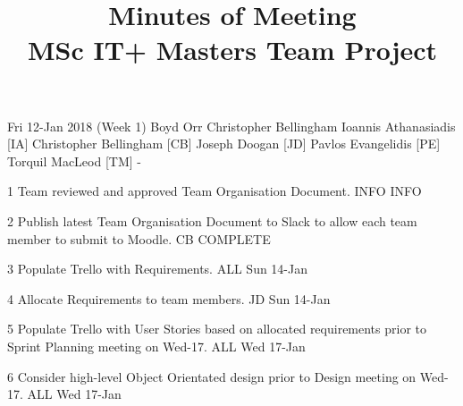 \documentclass[a4paper, 12pt]{article}
\title{Minutes of Meeting \\ MSc IT+ Masters Team Project}
\begin{document}
	\maketitle
	\momtoptable
	{Fri 12-Jan 2018 (Week 1)}
	{Boyd Orr}
	{Christopher Bellingham}
	{Ioannis Athanasiadis [IA]\newline
	Christopher Bellingham [CB]\newline
	Joseph Doogan [JD]\newline
	Pavlos Evangelidis [PE]\newline
	Torquil MacLeod [TM]}
	{-}

	\begin{momitems}
		\momitem
		{1}
		{Team reviewed and approved Team Organisation Document.}
		{INFO}
		{INFO}

		\momitem
		{2}
		{Publish latest Team Organisation Document to Slack to allow each team member to submit to Moodle.}
		{CB}
		{COMPLETE}

		\momitem
		{3}
		{Populate Trello with Requirements.}
		{ALL}
		{Sun 14-Jan}

		\momitem
		{4}
		{Allocate Requirements to team members.}
		{JD}
		{Sun 14-Jan}

		\momitem
		{5}
		{Populate Trello with User Stories based on allocated requirements prior to Sprint Planning meeting on Wed-17.}
		{ALL}
		{Wed 17-Jan}

		\momitem
		{6}
		{Consider high-level Object Orientated design prior to Design meeting on Wed-17.}
		{ALL}
		{Wed 17-Jan}

	\end{momitems}
\end{document}
